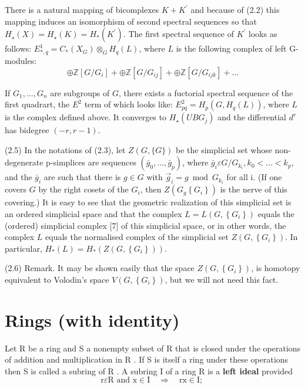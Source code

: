 There is a natural mapping of bicomplexes $K+K^{\prime}$ and because of (2.2) this mapping induces an isomorphism of second spectral sequences so that $H_{\star}(X)=H_{\star}(K)=H_*\left(K^{\prime}\right)$. The first spectral sequence of $K^{\prime}$ looks as follows: $E_{*, q}^1=C_*\left(X_G\right) \otimes_G H_q(L)$, where $L$ is the following complex of left G-modules:
$$
\oplus \mathbb{Z}\left[G / G_i\right]+\oplus \mathbb{Z}\left[G / G_{i j}\right]+\oplus \mathbb{Z}\left[G / G_{i j k}\right]+\ldots
$$


\begin{prop}
If $G_1, \ldots, G_n$ are subgroups of $G$, there exists a fuctorial spectral sequence of the first quadrart, the $E^2$ term of which looks like: $E_{p q}^2=H_p\left(G, H_q(L)\right)$, where $L$ is the complex defined above. It converges to $H_{\star}\left(U B G_j\right)$ and the differential $d^r$ has bidegree $(-r, r-1)$.   
\end{prop}

(2.5) In the notations of (2.3), let $Z(G,\{G\})$ be the simplicial set whose non-degenerate p-simplices are sequences $\left(\bar{g}_0, \ldots, \bar{g}_p\right)$, where $\bar{g}_i \varepsilon G / G_{k_i}, k_0<\ldots<k_p$, and the $\bar{g}_i$ are such that there is $g \in G$ with $\vec{g}_i=g \bmod G_{k_i}$ for all i. (If one covers $G$ by the right cosets of the $G_i$, then $Z\left(G_g\left\{G_i\right\}\right)$ is the nerve of this covering.) It is easy to see that the geometric realization of this simplicial set is an ordered simplicial space and that the complex $L=L\left(G,\left\{G_i\right\}\right)$ equals the (ordered) simplicial complex [7] of this simplicial space, or in other words, the complex $L$ equals the normalised complex of the simplicial set $Z\left(G,\left\{G_i\right\}\right)$. In particular, $H_*(L)=H_*\left(Z\left(G,\left\{G_i\right\}\right)\right)$.

(2.6) Remark. It may be shown easily that the space $Z\left(G,\left\{G_i\right\}\right)$, is homotopy equivalent to Volodin's space $V\left(G,\left\{G_i\right\}\right)$, but we will not need this fact.




\chapter{Rings (with identity)}

Let R be a ring and S a nonempty subset of R that is closed under the operations of addition and multiplication in R . If S is itself a ring under these operations then S is called a subring of R . A subring I of a ring R is a \textbf{left ideal} provided
$$
\mathrm{r} \varepsilon \mathrm{R} \text { and } \mathrm{x} \in \mathrm{I} \quad \Rightarrow \quad \mathrm{rx} \in \mathrm{I} \text {; }
$$


